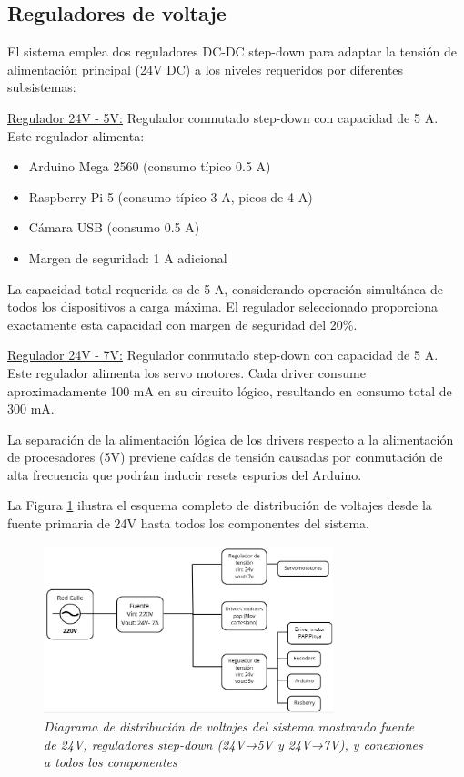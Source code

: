 \subsection{Reguladores de voltaje}

El sistema emplea dos reguladores DC-DC step-down para adaptar la tensión de alimentación principal (24V DC) a los niveles requeridos por diferentes subsistemas:

\underline{Regulador 24V - 5V:} Regulador conmutado step-down con capacidad de 5 A. Este regulador alimenta:
\begin{itemize}[label=$\bullet$]
\item Arduino Mega 2560 (consumo típico 0.5 A)
\item Raspberry Pi 5 (consumo típico 3 A, picos de 4 A)
\item Cámara USB (consumo 0.5 A)
\item Margen de seguridad: 1 A adicional
\end{itemize}

La capacidad total requerida es de 5 A, considerando operación simultánea de todos los dispositivos a carga máxima. El regulador seleccionado proporciona exactamente esta capacidad con margen de seguridad del 20\%.

\underline{Regulador 24V - 7V:} Regulador conmutado step-down con capacidad de 5 A. Este regulador alimenta los servo motores. Cada driver consume aproximadamente 100 mA en su circuito lógico, resultando en consumo total de 300 mA.

La separación de la alimentación lógica de los drivers respecto a la alimentación de procesadores (5V) previene caídas de tensión causadas por conmutación de alta frecuencia que podrían inducir resets espurios del Arduino.

La Figura \ref{fig:diagrama_voltajes} ilustra el esquema completo de distribución de voltajes desde la fuente primaria de 24V hasta todos los componentes del sistema.

\begin{figure}[H]
\centering
\includegraphics[width=0.75\textwidth]{imagenes/diagrama_voltajes.jpg}
\caption{\textit{Diagrama de distribución de voltajes del sistema mostrando fuente de 24V, reguladores step-down (24V→5V y 24V→7V), y conexiones a todos los componentes}}
\label{fig:diagrama_voltajes}
\end{figure}
